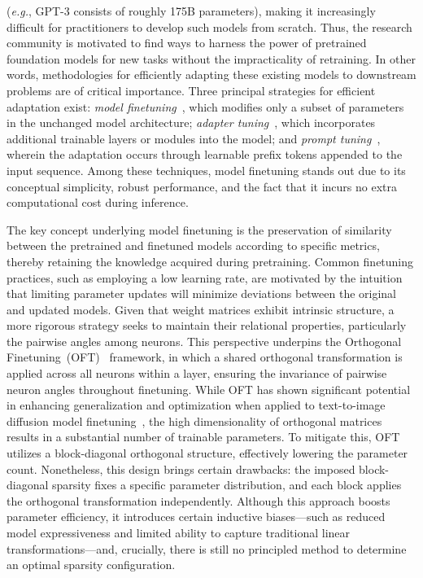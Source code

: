 (\emph{e.g.}, GPT-3 consists of roughly 175B parameters), making it increasingly difficult for practitioners to develop such models from scratch. Thus, the research community is motivated to find ways to harness the power of pretrained foundation models for new tasks without the impracticality of retraining. In other words, methodologies for efficiently adapting these existing models to downstream problems are of critical importance. Three principal strategies for efficient adaptation exist: \emph{model finetuning}~\cite{hulora2022,zaken2022bitfit,guo2020parameter,raffel2020exploring,qiu2023controlling,zhang2022adaptive,chavan2023one}, which modifies only a subset of parameters in the unchanged model architecture; \emph{adapter tuning}~\cite{rebuffi2017learning,houlsby2019parameter,pfeiffer2020adapterfusion,lin2020exploring,he2021towards}, which incorporates additional trainable layers or modules into the model; and \emph{prompt tuning}~\cite{li2021prefix,lester2021power}, wherein the adaptation occurs through learnable prefix tokens appended to the input sequence. Among these techniques, model finetuning stands out due to its conceptual simplicity, robust performance, and the fact that it incurs no extra computational cost during inference.

The key concept underlying model finetuning is the preservation of similarity between the pretrained and finetuned models according to specific metrics, thereby retaining the knowledge acquired during pretraining. Common finetuning practices, such as employing a low learning rate, are motivated by the intuition that limiting parameter updates will minimize deviations between the original and updated models. Given that weight matrices exhibit intrinsic structure, a more rigorous strategy seeks to maintain their relational properties, particularly the pairwise angles among neurons. This perspective underpins the Orthogonal Finetuning~(OFT)~\cite{qiu2023controlling} framework, in which a shared orthogonal transformation is applied across all neurons within a layer, ensuring the invariance of pairwise neuron angles throughout finetuning. While OFT has shown significant potential in enhancing generalization and optimization when applied to text-to-image diffusion model finetuning~\cite{qiu2023controlling}, the high dimensionality of orthogonal matrices results in a substantial number of trainable parameters. To mitigate this, OFT utilizes a block-diagonal orthogonal structure, effectively lowering the parameter count. Nonetheless, this design brings certain drawbacks: the imposed block-diagonal sparsity fixes a specific parameter distribution, and each block applies the orthogonal transformation independently. Although this approach boosts parameter efficiency, it introduces certain inductive biases—such as reduced model expressiveness and limited ability to capture traditional linear transformations—and, crucially, there is still no principled method to determine an optimal sparsity configuration.

